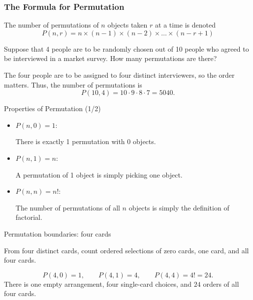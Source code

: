 \begin{frame}
\frametitle{The Formula for Permutation}
\begin{thm}{}{}
The number of permutations of $n$ objects taken $r$ at a time is denoted 
\[ P(n,r) = n \times  (n-1) \times (n-2) \times \ldots \times (n-r+1) \]
\end{thm}
\end{frame}


\begin{frame}[t]
\begin{ex}
Suppose that 4 people are to be randomly chosen out of 10 people who agreed to be interviewed in a market survey. How many permutations are there?
\end{ex}
\begin{sol}
The four people are to be assigned to four distinct interviewers, so the order matters. Thus, the number of permutations is 
\[P(10,4) = 10\cdot 9 \cdot 8 \cdot 7 = 5040.\]
\end{sol}
\end{frame}

\begin{frame}{Properties of Permutation (1/2)}
\begin{prop}{}{}
\begin{itemize}
\item $P(n, 0) = 1$: \begin{slide}There is exactly 1 permutation with 0 objects.\end{slide}
\item $P(n,1) = n$: \begin{slide}A permutation of 1 object is simply picking one object.\end{slide}
\item $P(n,n) = n!$: \begin{slide}The number of permutations of all $n$ objects is simply the definition of factorial.\end{slide}
\end{itemize}
\end{prop}
\end{frame}
\begin{frame}[t]{Permutation boundaries: four cards}
\small
\begin{ex}
From four distinct cards, count ordered selections of zero cards, one card, and all four cards.
\end{ex}
\begin{sol}
\[P(4,0)=1,\qquad P(4,1)=4,\qquad P(4,4)=4!=24.\] There is one empty arrangement, four single-card choices, and $24$ orders of all four cards.
\end{sol}
\end{frame}

